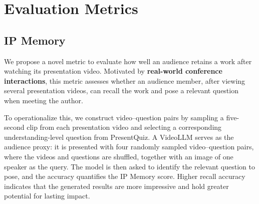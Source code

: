 
\section{Evaluation Metrics}
\subsection{IP Memory}
\label{sec:ip}
We propose a novel metric to evaluate how well an audience retains a work after watching its presentation video. Motivated by \textbf{real-world conference interactions}, this metric assesses whether an audience member, after viewing several presentation videos, can recall the work and pose a relevant question when meeting the author.

To operationalize this, we construct video–question pairs by sampling a five-second clip from each presentation video and selecting a corresponding understanding-level question from PresentQuiz. A VideoLLM serves as the audience proxy: it is presented with four randomly sampled video–question pairs, where the videos and questions are shuffled, together with an image of one speaker as the query. The model is then asked to identify the relevant question to pose, and the accuracy quantifies the IP Memory score. Higher recall accuracy indicates that the generated results are more impressive and hold greater potential for lasting impact.



